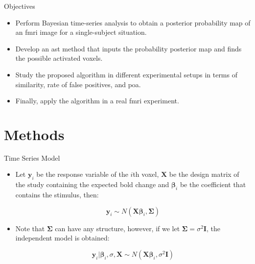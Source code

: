 \documentclass{beamer}
\begin{document}
\begin{frame}{Objectives}
\begin{itemize}
\item Perform Bayesian time-series analysis to obtain a posterior probability 
map of an \gls{fmri} image for a single-subject situation.
\item Develop an \gls{ast} method that inputs the probability posterior map 
and finds the possible activated voxels.
\item Study the proposed algorithm in different experimental setups in terms of 
similarity, rate of false positives, and \acrlong{poa}.
\item Finally, apply the algorithm in a real \gls{fmri} experiment.
\end{itemize}
\end{frame}



\section{Methods}


\begin{frame}{Time Series Model}
\begin{itemize}
\item Let $\bm{y}_i$ be the response variable of the $i$th voxel, $\bm{X}$ 
be the design matrix of the study containing the expected \gls{bold} change and 
$\bm{\beta}_i$ be the coefficient that contains the stimulus, then:

$$ \bm{y}_i \sim N \left( \bm{X} \bm{\beta}_i , \bm{\Sigma} \right)$$

\item Note that $\bm{\Sigma}$ can have any structure, however, if we 
let $\bm{\Sigma} = \sigma^2 \bm{I}$, the independent model is obtained:

$$ \bm{y}_i|\bm{\beta}_i, \sigma, \bm{X} \sim N \left( \bm{X} \bm{\beta}_i,\sigma^2\bm{I} \right) $$
\end{itemize}
\end{frame}
\end{document}
